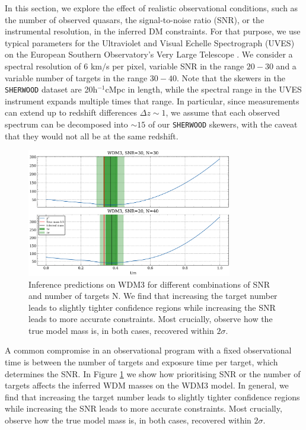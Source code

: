 In this section, we explore the effect of realistic observational conditions, such as the number of observed quasars, the signal-to-noise ratio (SNR), or the instrumental resolution, in the inferred DM constraints. For that purpose, we use typical parameters for the Ultraviolet and Visual Echelle Spectrograph (UVES) on the European Southern Observatory's Very Large Telescope \cite{Murphy_2018}. We consider a spectral resolution of $6$ km$/$s per pixel, variable SNR in the range $20-30$ and a variable number of targets in the range $30-40$. Note that the skewers in the \texttt{SHERWOOD} dataset are 20h$^{-1}$cMpc in length, while the spectral range in the UVES instrument expands multiple times that range. In particular, since measurements can extend up to redshift differences $\Delta z \sim 1$, we assume that each observed spectrum can be decomposed into $\sim 15$ of our \texttt{SHERWOOD} skewers, with the caveat that they would not all be at the same redshift.


\begin{figure}
    \centering
    \includegraphics[width=0.8\textwidth]{img/ML/SNR_vs_N.png}
    \caption{Inference predictions on WDM3 for different combinations of SNR and number of targets N. We find that increasing the target number leads to slightly tighter confidence regions while increasing the SNR leads to more accurate constraints. Most crucially, observe how the true model mass is, in both cases, recovered within $2\sigma$. }
    \label{fig: inference snr vs n}
\end{figure}

A common compromise in an observational program with a fixed observational time is between the number of targets and exposure time per target, which determines the SNR. In Figure \ref{fig: inference snr vs n} we show how prioritising SNR or the number of targets affects the inferred WDM masses on the WDM3 model. In general, we find that increasing the target number leads to slightly tighter confidence regions while increasing the SNR leads to more accurate constraints. Most crucially, observe how the true model mass is, in both cases, recovered within $2\sigma$.

